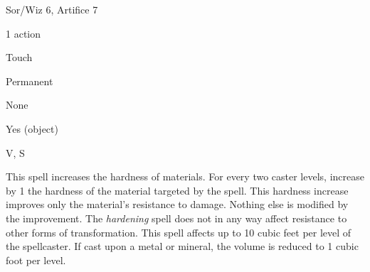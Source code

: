
\begin{description*}
\item[Level:] Sor/Wiz 6, Artifice 7
\item[Casting Time:] 1 action
\item[Range:] Touch
\item[Duration:] Permanent
\item[Saving Throw:] None
\item[Spell Resistance:] Yes (object)
\item[Components:] V, S
\end{description*}

This spell increases the hardness of materials.  For every two caster levels, increase
by 1 the hardness of the material targeted by the spell. This hardness increase
improves only the material's resistance to damage. Nothing else is modified by
the improvement.
The \textit{hardening} spell does not in any way affect resistance to other forms
of transformation.
This spell affects up to 10 cubic feet per level of the spellcaster.
If cast upon a metal or mineral, the volume is reduced to 1 cubic foot per level.